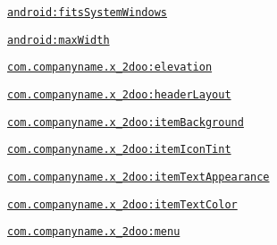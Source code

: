 {\tt \hyperlink{classandroid_1_1support_1_1v4_1_1_r_1_1styleable_8fef1cdf6a087e5067022f2a52afaf85}{android:fitsSystemWindows}}

{\tt \hyperlink{classandroid_1_1support_1_1v4_1_1_r_1_1styleable_10571fdca8781dd2769893b7a2204a50}{android:maxWidth}}

{\tt \hyperlink{classandroid_1_1support_1_1v4_1_1_r_1_1styleable_bb75dddc513645cd42bbfa399042cef3}{com.companyname.x\_\-2doo:elevation}}

{\tt \hyperlink{classandroid_1_1support_1_1v4_1_1_r_1_1styleable_fe0580320d0eaac865d84f4737141ad0}{com.companyname.x\_\-2doo:headerLayout}}

{\tt \hyperlink{classandroid_1_1support_1_1v4_1_1_r_1_1styleable_eab074addccc9ceec10abf5ca55513c9}{com.companyname.x\_\-2doo:itemBackground}}

{\tt \hyperlink{classandroid_1_1support_1_1v4_1_1_r_1_1styleable_98d85bc9f9bd29fcdd3e78ac5d8ccafd}{com.companyname.x\_\-2doo:itemIconTint}}

{\tt \hyperlink{classandroid_1_1support_1_1v4_1_1_r_1_1styleable_b1a0c348b812e885f19add02ede8941e}{com.companyname.x\_\-2doo:itemTextAppearance}}

{\tt \hyperlink{classandroid_1_1support_1_1v4_1_1_r_1_1styleable_a57c40afd9bad59379ce3cb367835803}{com.companyname.x\_\-2doo:itemTextColor}}

{\tt \hyperlink{classandroid_1_1support_1_1v4_1_1_r_1_1styleable_6c7bd4b9c988fb62f1fabb28c57b981a}{com.companyname.x\_\-2doo:menu}}

